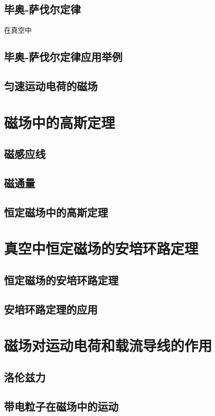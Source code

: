     \subsection{毕奥‑萨伐尔定律}
    在真空中
    \subsection{毕奥‑萨伐尔定律应用举例}
    \subsection{匀速运动电荷的磁场}

\section{磁场中的高斯定理}
    \subsection{磁感应线}
    \subsection{磁通量}
    \subsection{恒定磁场中的高斯定理}

\section{真空中恒定磁场的安培环路定理}
    \subsection{恒定磁场的安培环路定理}
    \subsection{安培环路定理的应用}

\section{磁场对运动电荷和载流导线的作用}
    \subsection{洛伦兹力}
    \subsection{带电粒子在磁场中的运动}
